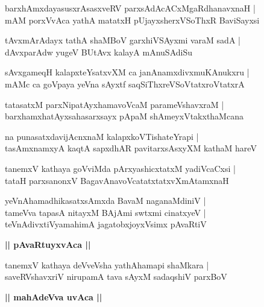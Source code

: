 \documentclass[twoside,12pt,openright]{book}
\newcounter{shloka}[chapter]
\def\uvaca#1{\centerline{{\large\textbf{#1}}}}
\begin{document}
\begin{shloka}%
barxhAmxdayasusxrAsasxveRV parxsAdAcACxMgaRdhanavxnaH |\\
mAM porxVvAca yathA matatxH pUjayxsherxVSoThxR BaviSayxsi 
\end{shloka}

\begin{shloka}%
tAvxmArAdayx tathA shaMBoV garxhiVSAyxmi varaM sadA |\\
dAvxparAdw yugeV BUtAvx kalayA mAnuSAdiSu
\end{shloka}

\begin{shloka}%
sAvxgameqH kalapxteYsatxvXM ca  janAnamxdivxmuKAnukxru |\\
mAMc ca goVpaya yeVna sAyxtf saqSiThxreVSoVtatxroVtatxrA 
\end{shloka}

\begin{shloka}%
tatasatxM parxNipatAyxhamavoVcaM parameVshavxraM |\\
barxhamxhatAyxsahasarxsayx pApaM shAmeyxVtakxthaMcana 
\end{shloka}

\begin{shloka}%
na punasatxdavijAcnxnaM kalapxkoVTishateYrapi |\\
tasAmxnamxyA kaqtA sapxdhAR pavitarxsAsxyXM kathaM hareV 	
\end{shloka}

\begin{shloka}%
tanemxV kathaya goVviMda pArxyashicxtatxM yadiVcaCxsi |\\
tataH parxsanonxV BagavAnavoVcatatxtatxvXmAtamxnaH
\end{shloka}

\begin{shloka}%
yeVnAhamadhikasatxsAmxda BavaM naganaMdiniV |\\
tameVva tapasA nitayxM BAjAmi swtxmi cinatxyeV |\\
teVnAdivxtiVyamahimA jagatobxjoyxVsimx pAvaRtiV 
\end{shloka}

\uvaca{|| pAvaRtuyxvAca ||}

\begin{shloka}%
tanemxV kathaya deVveVsha yathAhamapi shaMkara |\\
saveRVshavxriV nirupamA tava sAyxM sadaqshiV parxBoV 
\end{shloka}

\uvaca{|| mahAdeVva uvAca ||}
\end{document}
